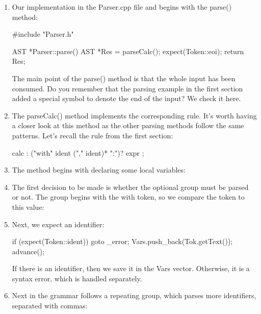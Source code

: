 \begin{enumerate}
\item
Our implementation in the Parser.cpp file and begins with the parse() method:

\begin{cpp}
#include "Parser.h"

AST *Parser::parse() {
    AST *Res = parseCalc();
    expect(Token::eoi);
    return Res;
}
\end{cpp}

The main point of the parse() method is that the whole input has been consumed. Do you remember that the parsing example in the first section added a special symbol to denote the end of the input? We check it here.

\item
The parseCalc() method implements the corresponding rule. It’s worth having a closer look at this method as the other parsing methods follow the same patterns. Let’s recall the rule from the first section:

\begin{cpp}
calc : ("with" ident ("," ident)* ":")? expr ;
\end{cpp}

\item
The method begins with declaring some local variables:

\begin{cpp}
AST *Parser::parseCalc() {
    Expr *E;
    llvm::SmallVector<llvm::StringRef, 8> Vars;
\end{cpp}

\item
The first decision to be made is whether the optional group must be parsed or not. The group begins with the with token, so we compare the token to this value:

\begin{cpp}
if (Tok.is(Token::KW_with)) {
    advance();
\end{cpp}

\item
Next, we expect an identifier:

\begin{cpp}
    if (expect(Token::ident))
        goto _error;
    Vars.push_back(Tok.getText());
    advance();
\end{cpp}

If there is an identifier, then we save it in the Vars vector. Otherwise, it is a syntax error, which is handled separately.

\item
Next in the grammar follows a repeating group, which parses more identifiers, separated with commas:


\end{enumerate}
